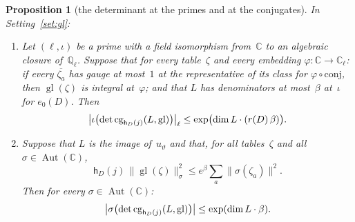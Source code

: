 \documentclass[11pt,a4paper]{article}
\newcommand{\m}[1]{\mbox{$#1$}}        %
\theoremstyle{plainx}
\newtheorem{proposition}[theorem]{Proposition}
\theoremstyle{uprightx}
\newcommand{\CC}{\mathbb{C}}
\newcommand{\AutC}{\operatorname{Aut}(\CC)}
\newcommand{\nsq}[2]{\|#1\|^{2}_{#2}}
\begin{document}
\begin{proposition}[the determinant at the primes and at the conjugates]\label{p:det}
In Setting~\ref{set:gl}:
\begin{enumerate}[label=\textup{(\alph*)},leftmargin=2.3em,itemsep=2pt]
\item Let \m{(\ell,\iota)} be a prime with a field isomorphism from~$\CC$ to an algebraic closure
of~$\mathbb{Q}_\ell$. Suppose that for every table~$\zeta$ and every embedding \m{\varphi\colon\CC\to\CC_\ell}: if every
\m{\overline{\zeta_a}} has gauge at most~$1$ at the representative of its class for \m{\varphi\circ\mathrm{conj}}, then
\m{\operatorname{gl}(\zeta)} is integral at~$\varphi$; and that $L$ has denominators at most~$\beta$ at~$\iota$ for
\m{e_0(D)}. Then
\[\bigl|\iota\bigl(\det\operatorname{cg}_{\mathsf{h}_D(j)}(L,\operatorname{gl})\bigr)\bigr|_\ell\le\exp\bigl(\dim L\cdot(r(D)\,\beta)\bigr).\]
\item Suppose that $L$ is the image of~$u_\vartheta$ and that, for all tables~$\zeta$ and all \m{\sigma\in\AutC},
\[\mathsf{h}_D(j)\,\nsq{\operatorname{gl}(\zeta)}{\sigma}\le e^{\beta}\sum_a\|\sigma(\zeta_a)\|^2 .\]
Then for every \m{\sigma\in\AutC}:
\[\bigl|\sigma\bigl(\det\operatorname{cg}_{\mathsf{h}_D(j)}(L,\operatorname{gl})\bigr)\bigr|\le\exp(\dim L\cdot\beta).\]
\end{enumerate}
\end{proposition}
\end{document}
